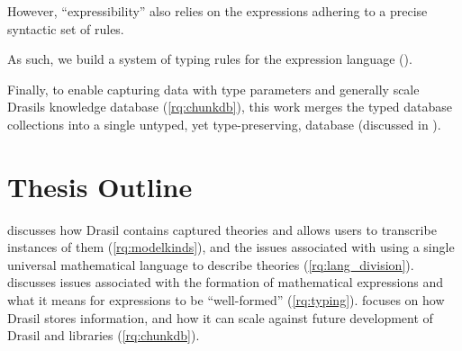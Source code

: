 However, ``expressibility'' also relies on the expressions adhering to a precise
syntactic set of rules.

As such, we build a system of typing rules for the expression language
().

Finally, to enable capturing data with type parameters and generally scale
Drasils knowledge database (\ref{rq:chunkdb}), this work merges the typed
database collections into a single untyped, yet type-preserving, database
(discussed in ).

\section{Thesis Outline}
\label{sec:intro:outline}

 discusses how Drasil contains captured theories and
allows users to transcribe instances of them (\ref{rq:modelkinds}), and the
issues associated with using a single universal mathematical language to
describe theories (\ref{rq:lang_division}).  discusses
issues associated with the formation of mathematical expressions and what it
means for expressions to be ``well-formed'' (\ref{rq:typing}).
 focuses on how Drasil stores information, and how it
can scale against future development of Drasil and libraries (\ref{rq:chunkdb}).
